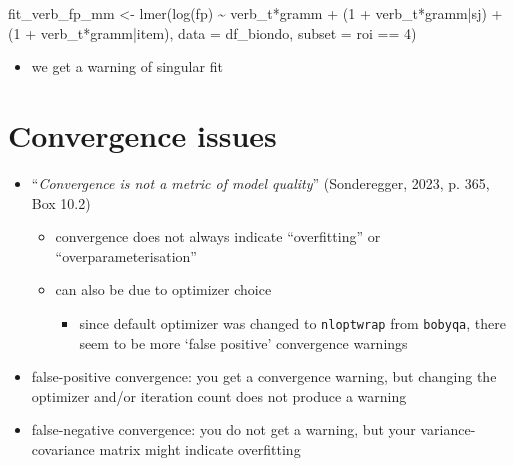 \documentclass[
  letterpaper,
  DIV=11,
  numbers=noendperiod]{scrartcl}
\newenvironment{Shaded}{\begin{snugshade}}{\end{snugshade}}
\newcommand{\AttributeTok}[1]{\textcolor[rgb]{0.40,0.45,0.13}{#1}}
\newcommand{\DecValTok}[1]{\textcolor[rgb]{0.68,0.00,0.00}{#1}}
\newcommand{\FunctionTok}[1]{\textcolor[rgb]{0.28,0.35,0.67}{#1}}
\newcommand{\NormalTok}[1]{\textcolor[rgb]{0.00,0.23,0.31}{#1}}
\newcommand{\OtherTok}[1]{\textcolor[rgb]{0.00,0.23,0.31}{#1}}
\newcommand{\SpecialCharTok}[1]{\textcolor[rgb]{0.37,0.37,0.37}{#1}}
\providecommand{\tightlist}{%
  \setlength{\itemsep}{0pt}\setlength{\parskip}{0pt}}\usepackage{longtable,booktabs,array}
\begin{document}
\begin{Shaded}
\begin{Highlighting}[]
\NormalTok{fit\_verb\_fp\_mm }\OtherTok{\textless{}{-}} \FunctionTok{lmer}\NormalTok{(}\FunctionTok{log}\NormalTok{(fp) }\SpecialCharTok{\textasciitilde{}}\NormalTok{ verb\_t}\SpecialCharTok{*}\NormalTok{gramm }\SpecialCharTok{+} 
\NormalTok{                      (}\DecValTok{1} \SpecialCharTok{+}\NormalTok{ verb\_t}\SpecialCharTok{*}\NormalTok{gramm}\SpecialCharTok{|}\NormalTok{sj) }\SpecialCharTok{+}
\NormalTok{                      (}\DecValTok{1} \SpecialCharTok{+}\NormalTok{ verb\_t}\SpecialCharTok{*}\NormalTok{gramm}\SpecialCharTok{|}\NormalTok{item),}
                    \AttributeTok{data =}\NormalTok{ df\_biondo,}
                    \AttributeTok{subset =}\NormalTok{ roi }\SpecialCharTok{==} \DecValTok{4}\NormalTok{)}
\end{Highlighting}
\end{Shaded}

\begin{itemize}
\tightlist
\item
  we get a warning of singular fit
\end{itemize}

\hypertarget{convergence-issues}{%
\section{Convergence issues}\label{convergence-issues}}

\begin{itemize}
\tightlist
\item
  ``\emph{Convergence is not a metric of model quality}'' (Sonderegger,
  2023, p. 365, Box 10.2)

  \begin{itemize}
  \tightlist
  \item
    convergence does not always indicate ``overfitting'' or
    ``overparameterisation''
  \item
    can also be due to optimizer choice

    \begin{itemize}
    \tightlist
    \item
      since default optimizer was changed to \texttt{nloptwrap} from
      \texttt{bobyqa}, there seem to be more `false positive'
      convergence warnings
    \end{itemize}
  \end{itemize}
\item
  false-positive convergence: you get a convergence warning, but
  changing the optimizer and/or iteration count does not produce a
  warning
\item
  false-negative convergence: you do not get a warning, but your
  variance-covariance matrix might indicate overfitting
\end{itemize}
\end{document}
